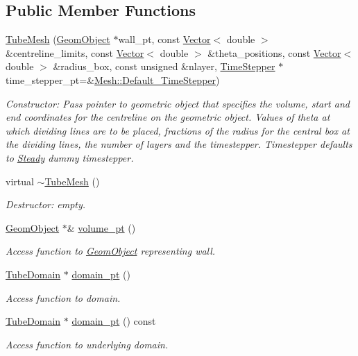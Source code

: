 \subsection*{Public Member Functions}
\begin{DoxyCompactItemize}
\item 
\hyperlink{classoomph_1_1TubeMesh_a6c2aaa81de6298a3f3a7bf1ae4d2b11d}{Tube\+Mesh} (\hyperlink{classoomph_1_1GeomObject}{Geom\+Object} $\ast$wall\+\_\+pt, const \hyperlink{classoomph_1_1Vector}{Vector}$<$ double $>$ \&centreline\+\_\+limits, const \hyperlink{classoomph_1_1Vector}{Vector}$<$ double $>$ \&theta\+\_\+positions, const \hyperlink{classoomph_1_1Vector}{Vector}$<$ double $>$ \&radius\+\_\+box, const unsigned \&nlayer, \hyperlink{classoomph_1_1TimeStepper}{Time\+Stepper} $\ast$time\+\_\+stepper\+\_\+pt=\&\hyperlink{classoomph_1_1Mesh_a12243d0fee2b1fcee729ee5a4777ea10}{Mesh\+::\+Default\+\_\+\+Time\+Stepper})
\begin{DoxyCompactList}\small\item\em Constructor\+: Pass pointer to geometric object that specifies the volume, start and end coordinates for the centreline on the geometric object. Values of theta at which dividing lines are to be placed, fractions of the radius for the central box at the dividing lines, the number of layers and the timestepper. Timestepper defaults to \hyperlink{classoomph_1_1Steady}{Steady} dummy timestepper. \end{DoxyCompactList}\item 
virtual \hyperlink{classoomph_1_1TubeMesh_af77e5d5022c77c3bf7340387258b2d51}{$\sim$\+Tube\+Mesh} ()
\begin{DoxyCompactList}\small\item\em Destructor\+: empty. \end{DoxyCompactList}\item 
\hyperlink{classoomph_1_1GeomObject}{Geom\+Object} $\ast$\& \hyperlink{classoomph_1_1TubeMesh_a152971dbd327aaf840fd157bad87d995}{volume\+\_\+pt} ()
\begin{DoxyCompactList}\small\item\em Access function to \hyperlink{classoomph_1_1GeomObject}{Geom\+Object} representing wall. \end{DoxyCompactList}\item 
\hyperlink{classoomph_1_1TubeDomain}{Tube\+Domain} $\ast$ \hyperlink{classoomph_1_1TubeMesh_a96715b52dbbccaaf89d722a05e57e28a}{domain\+\_\+pt} ()
\begin{DoxyCompactList}\small\item\em Access function to domain. \end{DoxyCompactList}\item 
\hyperlink{classoomph_1_1TubeDomain}{Tube\+Domain} $\ast$ \hyperlink{classoomph_1_1TubeMesh_a223a82a89304553d71b279aa6fe045fd}{domain\+\_\+pt} () const
\begin{DoxyCompactList}\small\item\em Access function to underlying domain. \end{DoxyCompactList}\end{DoxyCompactItemize}
